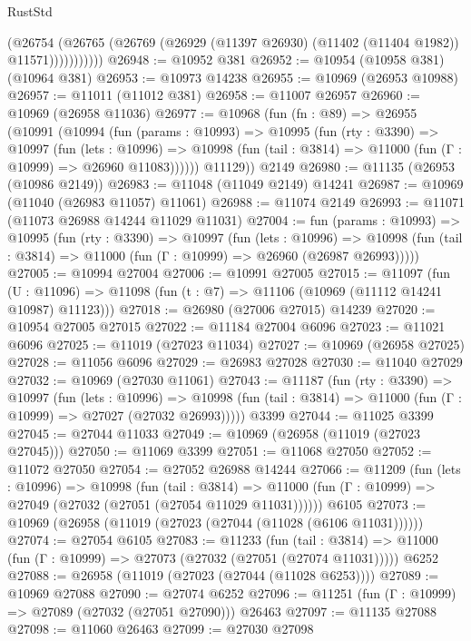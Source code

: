 \begin{lexlean}{RustStd}
\begin{coremodule}
                  (@26754
                    (@26765
                      (@26769 (@26929 (@11397 @26930) (@11402 (@11404 @1982)) @11571)))))))))))
@26948 := @10952 @381
@26952 := @10954 (@10958 @381) (@10964 @381)
@26953 := @10973 @14238
@26955 := @10969 (@26953 @10988)
@26957 := @11011 (@11012 @381)
@26958 := @11007 @26957
@26960 := @10969 (@26958 @11036)
@26977 := @10968
    (fun (fn : @89) =>
    @26955
      (@10991
        (@10994
          (fun (params : @10993) =>
          @10995
            (fun (rty : @3390) =>
            @10997
              (fun (lets : @10996) =>
              @10998 (fun (tail : @3814) => @11000 (fun (Γ : @10999) => @26960 @11083))))))
        @11129))
    @2149
@26980 := @11135 (@26953 (@10986 @2149))
@26983 := @11048 (@11049 @2149) @14241
@26987 := @10969 (@11040 (@26983 @11057) @11061)
@26988 := @11074 @2149
@26993 := @11071 (@11073 @26988 @14244 @11029 @11031)
@27004 := fun (params : @10993) =>
  @10995
    (fun (rty : @3390) =>
    @10997
      (fun (lets : @10996) =>
      @10998 (fun (tail : @3814) => @11000 (fun (Γ : @10999) => @26960 (@26987 @26993)))))
@27005 := @10994 @27004
@27006 := @10991 @27005
@27015 := @11097
    (fun (U : @11096) => @11098 (fun (t : @7) => @11106 (@10969 (@11112 @14241 @10987) @11123)))
@27018 := @26980 (@27006 @27015) @14239
@27020 := @10954 @27005 @27015
@27022 := @11184 @27004 @6096
@27023 := @11021 @6096
@27025 := @11019 (@27023 @11034)
@27027 := @10969 (@26958 @27025)
@27028 := @11056 @6096
@27029 := @26983 @27028
@27030 := @11040 @27029
@27032 := @10969 (@27030 @11061)
@27043 := @11187
    (fun (rty : @3390) =>
    @10997
      (fun (lets : @10996) =>
      @10998 (fun (tail : @3814) => @11000 (fun (Γ : @10999) => @27027 (@27032 @26993)))))
    @3399
@27044 := @11025 @3399
@27045 := @27044 @11033
@27049 := @10969 (@26958 (@11019 (@27023 @27045)))
@27050 := @11069 @3399
@27051 := @11068 @27050
@27052 := @11072 @27050
@27054 := @27052 @26988 @14244
@27066 := @11209
    (fun (lets : @10996) =>
    @10998
      (fun (tail : @3814) =>
      @11000 (fun (Γ : @10999) => @27049 (@27032 (@27051 (@27054 @11029 @11031))))))
    @6105
@27073 := @10969 (@26958 (@11019 (@27023 (@27044 (@11028 (@6106 @11031))))))
@27074 := @27054 @6105
@27083 := @11233
    (fun (tail : @3814) => @11000 (fun (Γ : @10999) => @27073 (@27032 (@27051 (@27074 @11031)))))
    @6252
@27088 := @26958 (@11019 (@27023 (@27044 (@11028 @6253))))
@27089 := @10969 @27088
@27090 := @27074 @6252
@27096 := @11251 (fun (Γ : @10999) => @27089 (@27032 (@27051 @27090))) @26463
@27097 := @11135 @27088
@27098 := @11060 @26463
@27099 := @27030 @27098

\end{coremodule}
\end{lexlean}
